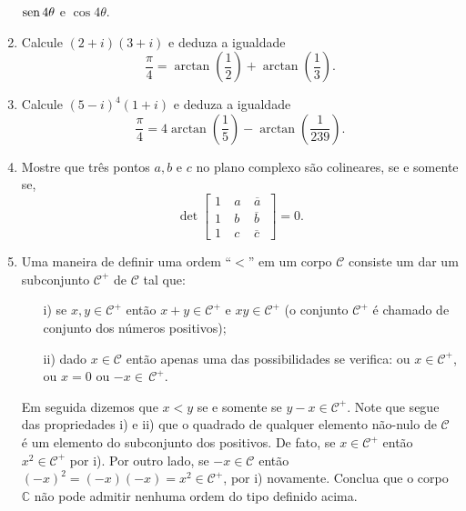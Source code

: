 \begin{enumerate}[leftmargin=*]
	$\operatorname{sen} 4\theta$ e $\cos 4\theta$.
	\item Calcule $(2+i)(3+i)$ e deduza a igualdade 
	$$
	\frac{\pi}{4}=\arctan\left( \frac{1}{2}\right)+\arctan\left( \frac{1}{3}\right).
	$$
	\item Calcule $(5-i)^4(1+i)$ e deduza a igualdade 
	$$
	\frac{\pi}{4}=4\arctan\left( \frac{1}{5}\right)-\arctan\left( \frac{1}{239}\right).
	$$
	\item Mostre que três pontos $a,b$ e $c$ no plano complexo são colineares, se e somente se, 
	$$
	\det\begin{bmatrix}
	    	1\ &a\ &\overline{a}\ \\
	    	1\ &b\ &\overline{b}\ \\
	    	1\ &c\ &\overline{c}\ 
	    \end{bmatrix}=0.
	$$


	\item Uma maneira de definir uma ordem ``$<$'' em um corpo $\mathscr{C}$ 
	consiste um dar um subconjunto $\mathscr{C}^+$ de 
	$\mathscr{C}$ tal que: 
	\begin{itemize}
		\item[i)] se $x,y\in\mathscr{C}^+$ então $x+y\in\mathscr{C}^+$ e $xy\in\mathscr{C}^+$ 
		(o conjunto $\mathscr{C}^+$ é chamado de conjunto dos números positivos);
		\item[ii)] dado $x\in\mathscr{C}$ então apenas uma das possibilidades se verifica: 
		ou $x\in\mathscr{C}^+$, ou $x=0$ ou $-x\in\,\mathscr{C}^+$.  
	\end{itemize}
	Em seguida dizemos que $x<y$ se e somente se $y-x\in \mathscr{C}^{+}$.
	Note que segue das propriedades i) e ii) que o quadrado de 
	qualquer elemento não-nulo de $\mathscr{C}$ é um elemento do subconjunto dos positivos.
	De fato, se $x\in\mathscr{C}^+$ então $x^2\in\mathscr{C}^+$ por i). Por outro lado, se $-x\in\mathscr{C}$ então 
	 $(-x)^2=(-x)(-x)=x^2\in \mathscr{C}^+$, por i) novamente. Conclua que o corpo $\mathbb{C}$ 
	 não pode admitir nenhuma ordem do tipo definido acima.
	
	
	

\end{enumerate}



